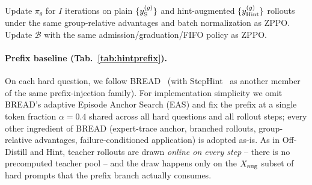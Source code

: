 \documentclass{llmxive}
\begin{document}
\begin{algorithm*}[!htbp]
{{    }
}
Update $\pi_\theta$ for $I$ iterations on plain $\{y_{\rm S}^{(g)}\}$ and hint-augmented $\{y_{\rm Hint}^{(g)}\}$ rollouts under the same group-relative advantages and batch normalization as ZPPO.\;
Update $\mathcal{B}$ with the same admission/graduation/FIFO policy as ZPPO.\;
\caption{Hint training step. Each step is tagged with the Guide-GRPO~\citep{nath2025adaptive} (A1--A4) and SEELE~\citep{li2025staying} (B1--B3) component it inherits. Teacher rollouts are drawn \emph{online on this step}, on the $X_{\rm aug}$ subset only, with no precomputed pool. Hint augmentation requires a correct teacher rollout at this step; hard questions without one (i.e.\ teacher fails on all $G_{\rm T}$ rollouts) fall back to the plain student rollout only.}
\label{alg:hint}
\end{algorithm*}

\paragraph{Prefix baseline (Tab.~\ref{tab:hintprefix}).}
On each hard question, we follow BREAD~\citep{zhang2025bread} (with StepHint~\citep{zhang2025stephint} as another member of the same prefix-injection family). For implementation simplicity we omit BREAD's adaptive Episode Anchor Search (EAS) and fix the prefix at a single token fraction $\alpha\!=\!0.4$ shared across all hard questions and all rollout steps; every other ingredient of BREAD (expert-trace anchor, branched rollouts, group-relative advantages, failure-conditioned application) is adopted as-is. As in Off-Distill and Hint, teacher rollouts are drawn \emph{online on every step} -- there is no precomputed teacher pool -- and the draw happens only on the $X_{\rm aug}$ subset of hard prompts that the prefix branch actually consumes.
\end{document}
